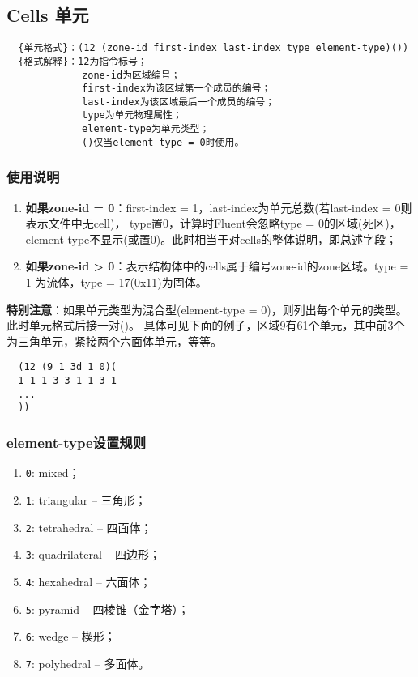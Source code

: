 \documentclass[lang=cn,11pt,a4paper]{elegantpaper}
\begin{document}
\subsection{Cells 单元}\label{Cells}
\begin{lstlisting}
  {单元格式}：(12 (zone-id first-index last-index type element-type)())
  {格式解释}：12为指令标号；
             zone-id为区域编号；
             first-index为该区域第一个成员的编号；
             last-index为该区域最后一个成员的编号；
             type为单元物理属性；
             element-type为单元类型；
             ()仅当element-type = 0时使用。
\end{lstlisting}

\subsubsection{使用说明}
\begin{enumerate}
  \item \textbf{如果zone-id = 0}：first-index = 1，last-index为单元总数(若last-index = 0则表示文件中无cell)，
                                  type置0，计算时Fluent会忽略type = 0的区域(死区)，element-type不显示(或置0)。此时相当于对cells的整体说明，即总述字段；
  \item \textbf{如果zone-id > 0}：表示结构体中的cells属于编号zone-id的zone区域。type = 1 为流体，type = 17(0x11)为固体。
\end{enumerate}

\textbf{特别注意}：如果单元类型为混合型(element-type = 0)，则列出每个单元的类型。此时单元格式后接一对()。
具体可见下面的例子，区域9有61个单元，其中前3个为三角单元，紧接两个六面体单元，等等。
\begin{lstlisting}
  (12 (9 1 3d 1 0)(
  1 1 1 3 3 1 1 3 1
  ...
  ))
\end{lstlisting}

\subsubsection{element-type设置规则}\label{element-type}
\begin{enumerate}[label=\arabic*).]
  \item \lstinline{0}: mixed；
  \item \lstinline{1}: triangular -- 三角形；
  \item \lstinline{2}: tetrahedral -- 四面体；
  \item \lstinline{3}: quadrilateral -- 四边形；
  \item \lstinline{4}: hexahedral -- 六面体；
  \item \lstinline{5}: pyramid -- 四棱锥（金字塔）；
  \item \lstinline{6}: wedge -- 楔形；
  \item \lstinline{7}: polyhedral -- 多面体。
\end{enumerate}
\end{document}
